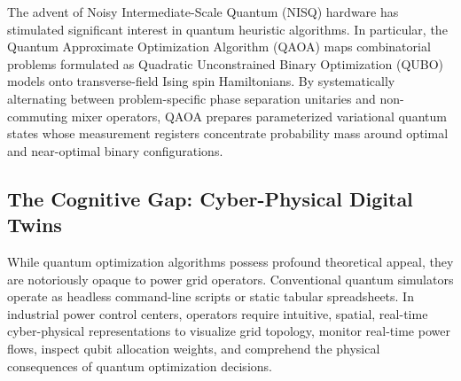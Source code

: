 \documentclass[11pt,a4paper]{article}
\theoremstyle{definition}
\theoremstyle{remark}
\begin{document}
The advent of Noisy Intermediate-Scale Quantum (NISQ) hardware \cite{preskill2018} has stimulated significant interest in quantum heuristic algorithms. In particular, the Quantum Approximate Optimization Algorithm (QAOA) \cite{farhi2014} maps combinatorial problems formulated as Quadratic Unconstrained Binary Optimization (QUBO) models onto transverse-field Ising spin Hamiltonians. By systematically alternating between problem-specific phase separation unitaries and non-commuting mixer operators, QAOA prepares parameterized variational quantum states whose measurement registers concentrate probability mass around optimal and near-optimal binary configurations.

\subsection{The Cognitive Gap: Cyber-Physical Digital Twins}
While quantum optimization algorithms possess profound theoretical appeal, they are notoriously opaque to power grid operators. Conventional quantum simulators operate as headless command-line scripts or static tabular spreadsheets. In industrial power control centers, operators require intuitive, spatial, real-time cyber-physical representations to visualize grid topology, monitor real-time power flows, inspect qubit allocation weights, and comprehend the physical consequences of quantum optimization decisions.
\end{document}
